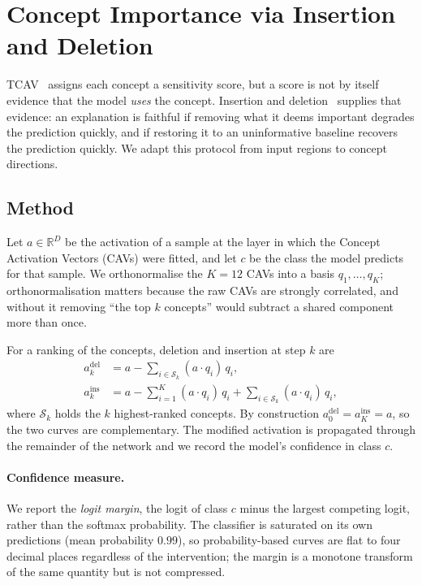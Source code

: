 
\section{Concept Importance via Insertion and Deletion}
\label{sec:concept-ablation}

TCAV~\cite{kim2018tcav} assigns each concept a sensitivity score, but a score is
not by itself evidence that the model \emph{uses} the concept. Insertion and
deletion~\cite{petsiuk2018rise} supplies that evidence: an explanation is
faithful if removing what it deems important degrades the prediction quickly,
and if restoring it to an uninformative baseline recovers the prediction
quickly. We adapt this protocol from input regions to concept directions.

\subsection{Method}
\label{sec:ablation-method}

Let $a \in \mathbb{R}^{D}$ be the activation of a sample at the layer in which
the Concept Activation Vectors (CAVs) were fitted, and let $c$ be the class the
model predicts for that sample. We orthonormalise the $K=12$ CAVs into a basis
$q_1,\dots,q_K$; orthonormalisation matters because the raw CAVs are strongly
correlated, and without it removing ``the top $k$ concepts'' would subtract a
shared component more than once.

For a ranking of the concepts, deletion and insertion at step $k$ are
\begin{align}
a^{\text{del}}_k &= a - \textstyle\sum_{i \in \mathcal{S}_k} (a \cdot q_i)\, q_i,\\
a^{\text{ins}}_k &= a - \textstyle\sum_{i=1}^{K} (a \cdot q_i)\, q_i
                     + \textstyle\sum_{i \in \mathcal{S}_k} (a \cdot q_i)\, q_i,
\end{align}
where $\mathcal{S}_k$ holds the $k$ highest-ranked concepts. By construction
$a^{\text{del}}_0 = a^{\text{ins}}_K = a$, so the two curves are complementary.
The modified activation is propagated through the remainder of the network and
we record the model's confidence in class $c$.

\paragraph{Confidence measure.}
We report the \emph{logit margin}, the logit of class $c$ minus the largest
competing logit, rather than the softmax probability. The classifier is
saturated on its own predictions (mean probability $0.99$), so probability-based
curves are flat to four decimal places regardless of the intervention; the
margin is a monotone transform of the same quantity but is not compressed.

